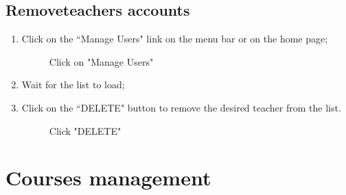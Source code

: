 \documentclass[ManualeUtente]{subfiles}
\begin{document}
	\subsection{Removeteachers accounts}
	\begin{enumerate}
		\item Click on the \textquotedblleft Manage Users" link on the menu bar or on the home page;
		\begin{figure}[H]
			\centering
			\caption{Click on "Manage Users"}
			\label{fig:Click on "Manage Users"}
		\end{figure}
		\item Wait for the list to load;
		\item Click on the \textquotedblleft DELETE" button to remove the desired teacher from the list.
		\begin{figure}[H]
			\centering
			\caption{Click "DELETE"}
			\label{fig:Click "DELETE"}
		\end{figure}
	\end{enumerate}
	
	
	\section{Courses management}
\end{document}
